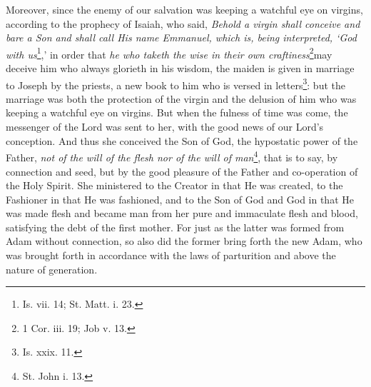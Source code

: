 Moreover, since the enemy of our salvation was keeping a watchful eye on virgins, according to the prophecy of Isaiah, who said, \emph{Behold a virgin shall conceive and bare a Son and shall call His name Emmanuel, which is, being interpreted, ‘God with us}\footnote{Is. vii. 14; St. Matt. i. 23.},’ in order that \emph{he who taketh the wise in their own craftiness}\footnote{1 Cor. iii. 19; Job v. 13.}may deceive him who always glorieth in his wisdom, the maiden is given in marriage to Joseph by the priests, a new book to him who is versed in letters\footnote{Is. xxix. 11.}: but the marriage was both the protection of the virgin and the delusion of him who was keeping a watchful eye on virgins. But when the fulness of time was come, the messenger of the Lord was sent to her, with the good news of our Lord’s conception. And thus she conceived the Son of God, the hypostatic power of the Father, \emph{not of the will of the flesh nor of the will of man}\footnote{St. John i. 13.}, that is to say, by connection and seed, but by the good pleasure of the Father and co-operation of the Holy Spirit. She ministered to the Creator in that He was created, to the Fashioner in that He was fashioned, and to the Son of God and God in that He was made flesh and became man from her pure and immaculate flesh and blood, satisfying the debt of the first mother. For just as the latter was formed from Adam without connection, so also did the former bring forth the new Adam, who was brought forth in accordance with the laws of parturition and above the nature of generation.

